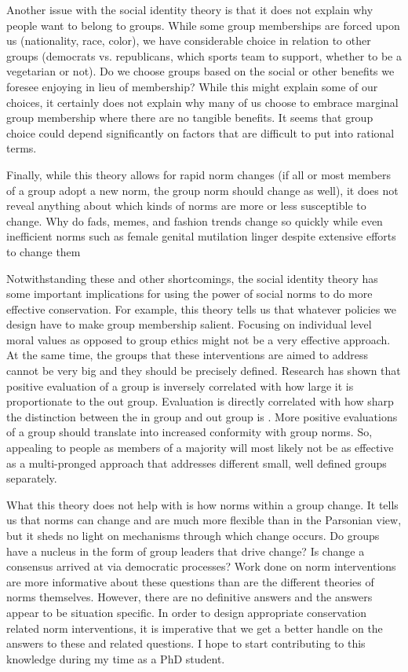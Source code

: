 \documentclass[rutwik_proposal.tex]{subfiles}
\begin{document}
Another issue with the social identity theory is that it does not explain why people want to belong to groups. While some group memberships are forced upon us (nationality, race, color), we have considerable choice in relation to other groups (democrats vs. republicans, which sports team to support, whether to be a vegetarian or not). Do we choose groups based on the social or other benefits we foresee enjoying in lieu of membership? While this might explain some of our choices, it certainly does not explain why many of us choose to embrace marginal group membership where there are no tangible benefits. It seems that group choice could depend significantly on factors that are difficult to put into rational terms.

Finally, while this theory allows for rapid norm changes (if all or most members of a group adopt a new norm, the group norm should change as well), it does not reveal anything about which kinds of norms are more or less susceptible to change. Why do fads, memes, and fashion trends change so quickly while even inefficient norms such as female genital mutilation linger despite extensive efforts to change them \cite{Mackie96, Shell-Duncan00}

Notwithstanding these and other shortcomings, the social identity theory has some important implications for using the power of social norms to do more effective conservation. For example, this theory tells us that whatever policies we design have to make group membership salient. Focusing on individual level moral values as opposed to group ethics might not be a very effective approach. At the same time, the groups that these interventions are aimed to address cannot be very big and they should be precisely defined. Research has shown that positive evaluation of a group is inversely correlated with how large it is proportionate to the out group. Evaluation is directly correlated with how sharp the distinction between the in group and out group is \cite{Mullen92}. More positive evaluations of a group should translate into increased conformity with group norms. So, appealing to people as members of a majority will most likely not be as effective as a multi-pronged approach that addresses different small, well defined groups separately.

What this theory does not help with is how norms within a group change. It tells us that norms can change and are much more flexible than in the Parsonian view, but it sheds no light on mechanisms through which change occurs. Do groups have a nucleus in the form of group leaders that drive change? Is change a consensus arrived at via democratic processes? Work done on norm interventions are more informative about these questions than are the different theories of norms themselves. However, there are no definitive answers and the answers appear to be situation specific. In order to design appropriate conservation related norm interventions, it is imperative that we get a better handle on the answers to these and related questions. I hope to start contributing to this knowledge during my time as a PhD student. 
\end{document}
